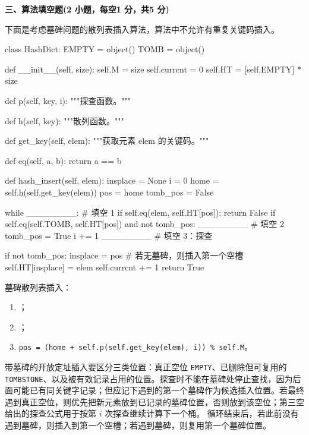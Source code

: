 \textbf{三、算法填空题(2 小题，每空1 分，共5 分)}
\begin{question}
下面是考虑墓碑问题的散列表插入算法，算法中不允许有重复关键码插入。\\
\begin{pycode}
class HashDict:
    EMPTY = object()
    TOMB = object()

    def __init__(self, size):
        self.M = size
        self.currcnt = 0
        self.HT = [self.EMPTY] * size

    def p(self, key, i):
        """探查函数。"""

    def h(self, key):
        """散列函数。"""

    def get_key(self, elem):
        """获取元素 elem 的关键码。"""

    def eq(self, a, b):
        return a == b

    def hash_insert(self, elem):
        insplace = None
        i = 0
        home = self.h(self.get_key(elem))
        pos = home
        tomb_pos = False

        while ________:                 # 填空 1
            if self.eq(elem, self.HT[pos]):
                return False
            if self.eq(self.TOMB, self.HT[pos]) and not tomb_pos:
                ________                # 填空 2
                tomb_pos = True
            i += 1
            ________                    # 填空 3：探查

        if not tomb_pos:
            insplace = pos              # 若无墓碑，则插入第一个空槽
        self.HT[insplace] = elem
        self.currcnt += 1
        return True
\end{pycode}
\begin{solution}
墓碑散列表插入：
  \begin{enumerate}[leftmargin=2em]
    \item \texttt{}；
    \item \texttt{}；
    \item \texttt{pos = (home + self.p(self.get\_key(elem), i)) \% self.M}。
  \end{enumerate}
带墓碑的开放定址插入要区分三类位置：真正空位 \texttt{EMPTY}、已删除但可复用的 \texttt{TOMBSTONE}、以及被有效记录占用的位置。探查时不能在墓碑处停止查找，因为后面可能已有同关键字记录；但应记下遇到的第一个墓碑作为候选插入位置。若最终遇到真正空位，则优先把新元素放到已记录的墓碑位置，否则放到该空位；第三空给出的探查公式用于按第 $i$ 次探查继续计算下一个桶。
  循环结束后，若此前没有遇到墓碑，则插入到第一个空槽；若遇到墓碑，则复用第一个墓碑位置。
\end{solution}
\end{question}

